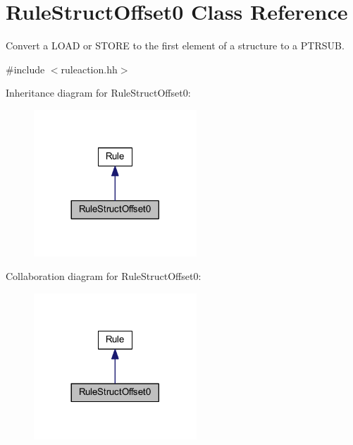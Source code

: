 \hypertarget{class_rule_struct_offset0}{}\section{Rule\+Struct\+Offset0 Class Reference}
\label{class_rule_struct_offset0}


Convert a L\+O\+AD or S\+T\+O\+RE to the first element of a structure to a P\+T\+R\+S\+UB.  




{\ttfamily \#include $<$ruleaction.\+hh$>$}



Inheritance diagram for Rule\+Struct\+Offset0\+:
\nopagebreak
\begin{figure}[H]
\begin{center}
\leavevmode
\includegraphics[width=173pt]{class_rule_struct_offset0__inherit__graph}
\end{center}
\end{figure}


Collaboration diagram for Rule\+Struct\+Offset0\+:
\nopagebreak
\begin{figure}[H]
\begin{center}
\leavevmode
\includegraphics[width=173pt]{class_rule_struct_offset0__coll__graph}
\end{center}
\end{figure}
